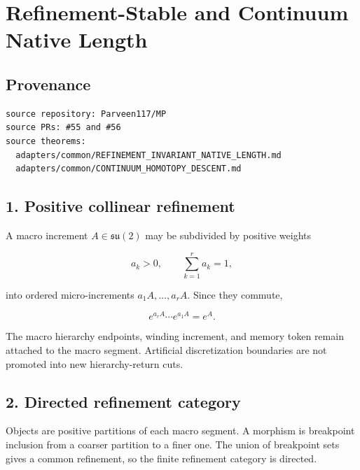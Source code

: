 \hypertarget{refinement-stable-and-continuum-native-length}{%
\chapter{Refinement-Stable and Continuum Native Length}\label{refinement-stable-and-continuum-native-length}}

\hypertarget{provenance}{%
\section{Provenance}\label{provenance}}

\begin{verbatim}
source repository: Parveen117/MP
source PRs: #55 and #56
source theorems:
  adapters/common/REFINEMENT_INVARIANT_NATIVE_LENGTH.md
  adapters/common/CONTINUUM_HOMOTOPY_DESCENT.md
\end{verbatim}

\hypertarget{positive-collinear-refinement}{%
\section{1. Positive collinear refinement}\label{positive-collinear-refinement}}

A macro increment \(A\in\mathfrak{su}(2)\) may be subdivided by positive weights

\[
a_k>0,
\qquad
\sum_{k=1}^r a_k=1,
\]

into ordered micro-increments \(a_1A,\ldots,a_rA\). Since they commute,

\[
e^{a_rA}\cdots e^{a_1A}=e^A.
\]

The macro hierarchy endpoints, winding increment, and memory token remain attached to the macro segment. Artificial discretization boundaries are not promoted into new hierarchy-return cuts.

\hypertarget{directed-refinement-category}{%
\section{2. Directed refinement category}\label{directed-refinement-category}}

Objects are positive partitions of each macro segment. A morphism is breakpoint inclusion from a coarser partition to a finer one. The union of breakpoint sets gives a common refinement, so the finite refinement category is directed.

